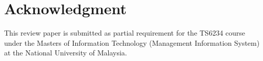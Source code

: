 \documentclass[conference, compsoc]{IEEEtran}
\begin{document}


\section*{Acknowledgment}

This review paper is submitted as partial requirement for the TS6234 course under the Masters of Information Technology (Management Information System) at the National University of Malaysia.


\end{document}
